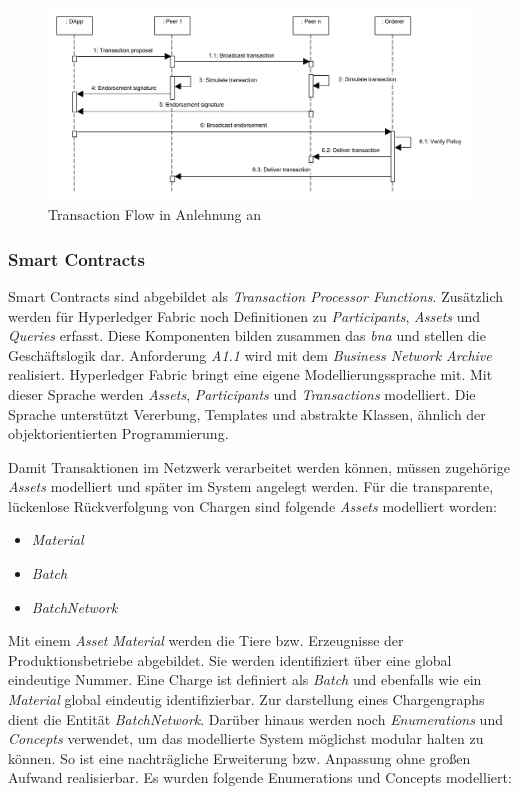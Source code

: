 \begin{figure}[H]
	\centering
	\includegraphics[width=1\linewidth]{pictures/transaction-flow}
	\caption[Transaction Flow]{Transaction Flow in Anlehnung an \citep{Choudhury2018}}
	\label{fig:transaction-flow}
\end{figure}

\subsubsection{Smart Contracts}\label{smart-contracts}
Smart Contracts sind abgebildet als \textit{Transaction Processor Functions}. Zusätzlich werden für Hyperledger Fabric noch Definitionen zu \textit{Participants}, \textit{Assets} und \textit{Queries} erfasst. Diese Komponenten bilden zusammen das \textit{\ac{bna}} und stellen die Geschäftslogik dar. Anforderung \textit{A1.1} wird mit dem \textit{Business Network Archive} realisiert. Hyperledger Fabric bringt eine eigene Modellierungssprache mit. Mit dieser Sprache werden \textit{Assets}, \textit{Participants} und \textit{Transactions} modelliert. Die Sprache unterstützt Vererbung, Templates und abstrakte Klassen, ähnlich der objektorientierten Programmierung.

Damit Transaktionen im Netzwerk verarbeitet werden können, müssen zugehörige \textit{Assets} modelliert und später im System angelegt werden. Für die transparente, lückenlose Rückverfolgung von Chargen sind folgende \textit{Assets} modelliert worden:

\begin{itemize}
	\item \textit{Material}
	\item \textit{Batch}
	\item \textit{BatchNetwork}
\end{itemize}

\noindent
Mit einem \textit{Asset} \textit{Material} werden die Tiere bzw. Erzeugnisse der Produktionsbetriebe abgebildet. Sie werden identifiziert über eine global eindeutige Nummer. Eine Charge ist definiert als \textit{Batch} und ebenfalls wie ein \textit{Material} global eindeutig identifizierbar. Zur darstellung eines Chargengraphs dient die Entität \textit{BatchNetwork}. Darüber hinaus werden noch \textit{Enumerations} und \textit{Concepts} verwendet, um das modellierte System möglichst modular halten zu können. So ist eine nachträgliche Erweiterung bzw. Anpassung ohne großen Aufwand realisierbar. Es wurden folgende Enumerations und Concepts modelliert:

